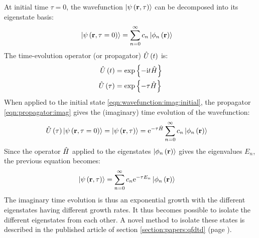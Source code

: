 At initial time $\tau = 0$, the wavefunction $\left| \psi\left( \textbf{r}, \tau \right) \right>$ can be
decomposed into its eigenstate basis:
\begin{align}
\left| \psi\left( \textbf{r}, \tau=0 \right) \right> & = \sum_{n=0}^{\infty} c_n \left| \phi_n\left( \textbf{r} \right) \right>
\label{eqn:wavefunction:imag:initial}
\end{align}
The time-evolution operator (or propagator) $\hat{U}\left( t \right)$ is:
\begin{align}
\hat{U}\left( t \right) & = \exp{ \left\{  - \textrm{i}t  \hat{H} \right\}}
\label{eqn:propagator:real} \\
\hat{U}\left( \tau \right) & = \exp{ \left\{  - \tau  \hat{H} \right\}}
\label{eqn:propagator:imag}
\end{align}
When applied to the initial state \eqref{eqn:wavefunction:imag:initial}, the
propagator \eqref{eqn:propagator:imag} gives the (imaginary) time evolution of
the wavefunction:
\begin{align}
\hat{U}\left( \tau \right) \left| \psi\left( \textbf{r}, \tau=0 \right) \right>
    = \left| \psi\left( \textbf{r}, \tau \right) \right>
  & = \textrm{e}^{ - \tau \hat{H} } \sum_{n=0}^{\infty} c_n \left| \phi_n\left( \textbf{r} \right) \right>
\end{align}
Since the operator $\hat{H}$ applied to the eigenstates
$\left| \phi_n\left( \textbf{r} \right) \right>$ gives the eigenvalues $E_n$, the previous equation
becomes:
\begin{align}
\left| \psi\left( \textbf{r}, \tau \right) \right>
 & = \sum_{n=0}^{\infty} c_n \textrm{e}^{ - \tau E_n } \left| \phi_n\left( \textbf{r} \right) \right>
\end{align}
The imaginary time evolution is thus an exponential growth with the different
eigenstates having different growth rates. It thus becomes possible to isolate
the different eigenstates from each other. A novel method to isolate these
states is described in the published article of section
\ref{section:papers:qfdtd} (page \pageref{section:papers:qfdtd}).




